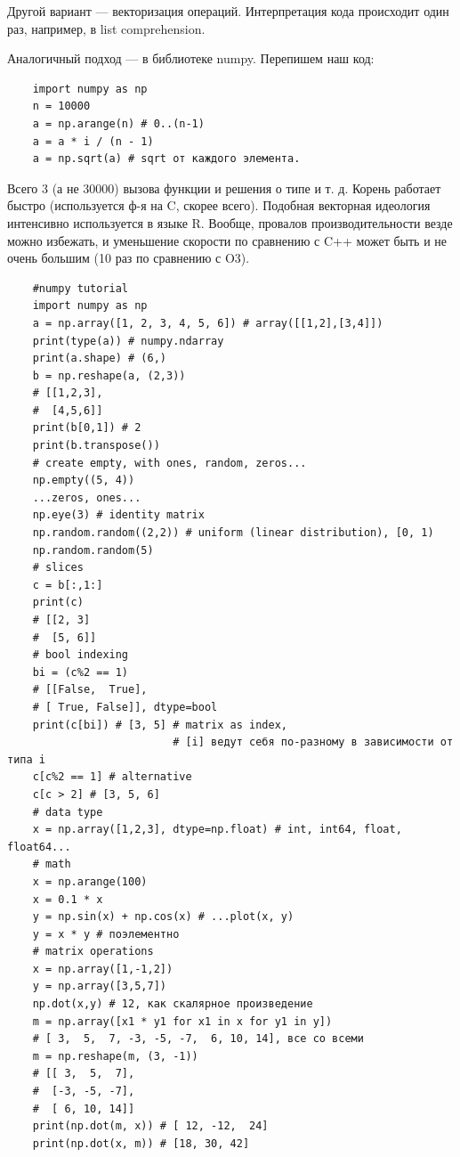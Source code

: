 \documentclass{book}
\begin{document}
Другой вариант --- векторизация операций. Интерпретация кода происходит один
раз, например, в list comprehension.

Аналогичный подход --- в библиотеке numpy. Перепишем наш код:
\begin{verbatim}
    import numpy as np
    n = 10000
    a = np.arange(n) # 0..(n-1)
    a = a * i / (n - 1)
    a = np.sqrt(a) # sqrt от каждого элемента.
\end{verbatim}
Всего 3 (а не 30000) вызова функции и решения о типе и т. д. Корень работает
быстро (используется ф-я на C, скорее всего). Подобная векторная идеология
интенсивно используется в языке R. Вообще, провалов производительности везде
можно избежать, и уменьшение скорости по сравнению с C++ может быть и не очень
большим (10 раз по сравнению с O3).

\begin{verbatim}
    #numpy tutorial
    import numpy as np
    a = np.array([1, 2, 3, 4, 5, 6]) # array([[1,2],[3,4]])
    print(type(a)) # numpy.ndarray
    print(a.shape) # (6,)
    b = np.reshape(a, (2,3))
    # [[1,2,3],
    #  [4,5,6]]
    print(b[0,1]) # 2
    print(b.transpose())
    # create empty, with ones, random, zeros...
    np.empty((5, 4))
    ...zeros, ones...
    np.eye(3) # identity matrix
    np.random.random((2,2)) # uniform (linear distribution), [0, 1)
    np.random.random(5)
    # slices
    c = b[:,1:]
    print(c)
    # [[2, 3]
    #  [5, 6]]
    # bool indexing
    bi = (c%2 == 1)
    # [[False,  True],
    # [ True, False]], dtype=bool
    print(c[bi]) # [3, 5] # matrix as index,
                          # [i] ведут себя по-разному в зависимости от типа i
    c[c%2 == 1] # alternative
    c[c > 2] # [3, 5, 6]
    # data type
    x = np.array([1,2,3], dtype=np.float) # int, int64, float, float64...
    # math
    x = np.arange(100)
    x = 0.1 * x
    y = np.sin(x) + np.cos(x) # ...plot(x, y)
    y = x * y # поэлементно
    # matrix operations
    x = np.array([1,-1,2])
    y = np.array([3,5,7])
    np.dot(x,y) # 12, как скалярное произведение
    m = np.array([x1 * y1 for x1 in x for y1 in y])
    # [ 3,  5,  7, -3, -5, -7,  6, 10, 14], все со всеми
    m = np.reshape(m, (3, -1))
    # [[ 3,  5,  7],
    #  [-3, -5, -7],
    #  [ 6, 10, 14]]
    print(np.dot(m, x)) # [ 12, -12,  24]
    print(np.dot(x, m)) # [18, 30, 42]
\end{verbatim}
\end{document}
